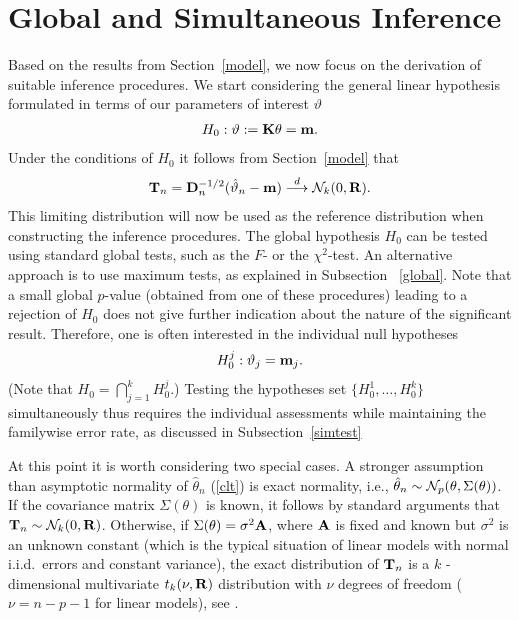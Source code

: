 \documentclass[12pt,a4paper]{article}
\begin{document}
\section{Global and Simultaneous Inference}

\label{siminf}

Based on the results from Section~\ref{model}, we now focus on the
derivation of suitable inference procedures. We start considering the
general linear hypothesis \citep{Searle1971} formulated in terms
of our parameters of interest $\vartheta$
\begin{eqnarray*}
H_0: \vartheta := \mathbf{K} \theta = \mathbf{m}.
\end{eqnarray*}
Under the conditions of $H_0$ it follows from Section~\ref{model} that 
\begin{eqnarray*}
\mathbf{T}_n = \mathbf{D}_n^{-1/2} (\hat{\vartheta}_n - \mathbf{m}) \stackrel{d}{\longrightarrow} \mathcal{N}_k(0, \mathbf{R}). 
\end{eqnarray*}
This
limiting distribution will now be used as the reference distribution when
constructing the inference procedures. The global hypothesis $H_0$ can be
tested using standard global tests, such as the $F$- or the $\chi^2$-test.
An alternative approach is to use maximum tests, as explained in Subsection~%
\ref{global}. Note that a small global $p$-value (obtained from one of these
procedures) leading to a rejection of $H_0$ 
does not give further indication about the nature of the significant
result. Therefore, one is often interested in the individual null hypotheses 
\begin{eqnarray*}
H_0^j: \vartheta_j = \mathbf{m}_j.
\end{eqnarray*}
(Note that $H_0 = \bigcap_{j = 1}^k H_0^j$.) Testing the hypotheses set $%
\{H_0^1, \ldots, H_0^k\}$ simultaneously thus requires the individual
assessments while maintaining the familywise error rate, as discussed in
Subsection~\ref{simtest}

At this point it is worth considering two special cases. A stronger
assumption than asymptotic normality of $\hat{\theta}_n$ (\ref{clt})
is exact normality, i.e., $\hat{\theta}_n \sim \mathcal{N}_p(\theta, \Sigma(\theta))$. 
If the covariance matrix $\Sigma(\theta)$ is known, it follows by
standard arguments that $\mathbf{T}_n \sim \mathcal{N}_k(0, \mathbf{R})$. Otherwise, if
$\Sigma(\theta) = \sigma^2 \mathbf{A}$, where $\mathbf{A}$ is fixed and known but $\sigma^2$ is an unknown
constant (which is the typical situation of linear models with normal
i.i.d.~errors and constant variance), the exact distribution of $\mathbf{T}_n$ is a $k$%
-dimensional multivariate $t_k(\nu, \mathbf{R})$ distribution with $\nu$ degrees
of freedom ($\nu = n - p - 1$ for linear models), see \citep{Tong1990}.
\end{document}
